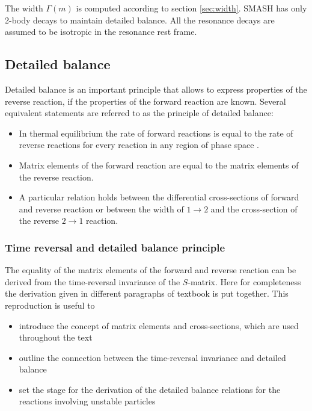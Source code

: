 The width $\Gamma(m)$ is computed according to section \ref{sec:width}.
SMASH has only 2-body decays to maintain detailed balance. All the resonance
decays are assumed to be isotropic in the resonance rest frame.

\subsection{Detailed balance} \label{sec:det_bal}

Detailed balance is an important principle that allows to express properties
of the reverse reaction, if the properties of the forward reaction are known.
Several equivalent statements are referred to as the principle of detailed balance:

\begin{itemize}
  \item In thermal equilibrium the rate of forward reactions is equal
        to the rate of reverse reactions for every reaction in any region
        of phase space \cite{Lifsh10}.
  \item Matrix elements of the forward reaction are equal to the matrix
        elements of the reverse  reaction.
  \item A particular relation holds between the differential cross-sections
        of forward and reverse reaction or between the width of $1 \to 2$
        and the cross-section of the reverse $2 \to 1$ reaction.
\end{itemize}

\subsubsection{Time reversal and detailed balance principle} \label{sec:smatrix}

The equality of the matrix elements of the forward and reverse reaction can be
derived from the time-reversal invariance of the $S$-matrix. Here for
completeness the derivation given in different paragraphs of textbook \cite{Lifsh4} is
put together. This reproduction is useful to

\begin{itemize}
  \item introduce the concept of matrix elements and cross-sections, which are used
        throughout the text
  \item outline the connection between the time-reversal invariance and detailed
        balance
  \item set the stage for the derivation of the detailed balance relations for the
        reactions involving unstable particles
\end{itemize}

